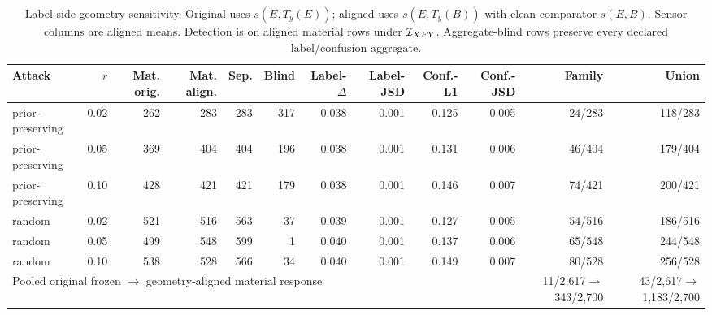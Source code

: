 \begin{table}[!t]
\caption{Label-side geometry sensitivity. Original uses $s(E,T_y(E))$; aligned uses $s(E,T_y(B))$ with clean comparator $s(E,B)$. Sensor columns are aligned means. Detection is on aligned material rows under $\mathcal I_{XFY}$. Aggregate-blind rows preserve every declared label/confusion aggregate.}
\label{tab:v137-label-geometry}
\centering\footnotesize\setlength{\tabcolsep}{2.4pt}
\begin{tabular}{@{}lrrrrrrrrrrr@{}}
\toprule
Attack & $r$ & Mat. orig. & Mat. align. & Sep. & Blind & Label-$\Delta$ & Label-JSD & Conf.-L1 & Conf.-JSD & Family & Union \\
\midrule
prior-preserving & 0.02 & 262 & 283 & 283 & 317 & 0.038 & 0.001 & 0.125 & 0.005 & 24/283 & 118/283 \\
prior-preserving & 0.05 & 369 & 404 & 404 & 196 & 0.038 & 0.001 & 0.131 & 0.006 & 46/404 & 179/404 \\
prior-preserving & 0.10 & 428 & 421 & 421 & 179 & 0.038 & 0.001 & 0.146 & 0.007 & 74/421 & 200/421 \\
random & 0.02 & 521 & 516 & 563 & 37 & 0.039 & 0.001 & 0.127 & 0.005 & 54/516 & 186/516 \\
random & 0.05 & 499 & 548 & 599 & 1 & 0.040 & 0.001 & 0.137 & 0.006 & 65/548 & 244/548 \\
random & 0.10 & 538 & 528 & 566 & 34 & 0.040 & 0.001 & 0.149 & 0.007 & 80/528 & 256/528 \\
\midrule
\multicolumn{10}{l}{Pooled original frozen $\rightarrow$ geometry-aligned material response} & 11/2,617$\rightarrow$343/2,700 & 43/2,617$\rightarrow$1,183/2,700 \\
\bottomrule
\end{tabular}
\end{table}
